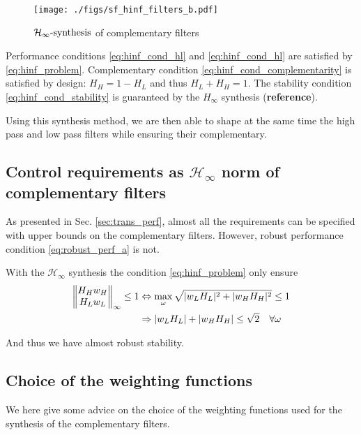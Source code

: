 \documentclass[9pt, technote, a4paper]{ieeeconf}
\begin{document}
\begin{figure}[htbp]
\centering
\texttt{[image: ./figs/sf\_hinf\_filters\_b.pdf]}
\caption{\label{fig:sf_hinf_filters_b}
\(\mathcal{H}_\infty\text{-synthesis}\) of complementary filters}
\end{figure}

Performance conditions \eqref{eq:hinf_cond_hl} and \eqref{eq:hinf_cond_hl} are satisfied by \eqref{eq:hinf_problem}.
Complementary condition \eqref{eq:hinf_cond_complementarity} is satisfied by design: \(H_H = 1 - H_L\) and thus \(H_L + H_H = 1\).
The stability condition \eqref{eq:hinf_cond_stability} is guaranteed by the \(H_\infty\) synthesis (\textbf{reference}).


Using this synthesis method, we are then able to shape at the same time the high pass and low pass filters while ensuring their complementary.

\subsection{Control requirements as \(\mathcal{H}_\infty\) norm of complementary filters}
\label{sec:orgb7d25ea}
As presented in Sec. \ref{sec:trans_perf}, almost all the requirements can be specified with upper bounds on the complementary filters.
However, robust performance condition \eqref{eq:robust_perf_a} is not.

With the \(\mathcal{H}_\infty\) synthesis the condition \eqref{eq:hinf_problem} only ensure
\begin{align*}
  \left\|\begin{matrix} H_H w_H \\ H_L w_L \end{matrix}\right\|_{\infty} \le 1 &\Leftrightarrow \max_\omega \sqrt{|w_L H_L|^2 + |w_H H_H|^2} \le 1\\
                                                             &\Rightarrow |w_L H_L| + |w_H H_H| \le \sqrt{2} \quad \forall\omega
\end{align*}

And thus we have almost robust stability.

\subsection{Choice of the weighting functions}
\label{sec:org2d7aa5b}
   \label{sec:hinf_weighting_func}
We here give some advice on the choice of the weighting functions used for the synthesis of the complementary filters.
\end{document}
